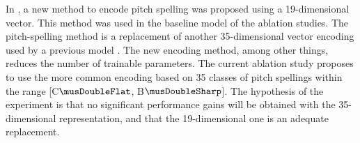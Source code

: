 
In , a new method to encode
pitch spelling was proposed using a 19-dimensional vector.
This method was used in the baseline model of the ablation
studies. The pitch-spelling method is a replacement of
another 35-dimensional vector encoding used by a previous
model \parencite{micchi2021deep}. The new encoding method,
among other things, reduces the number of trainable
parameters. The current ablation study proposes to use the
more common encoding based on 35 classes of pitch spellings
within the range [C$\musDoubleFlat$, B$\musDoubleSharp$].
The hypothesis of the experiment is that no significant
performance gains will be obtained with the 35-dimensional
representation, and that the 19-dimensional one is an
adequate replacement.
